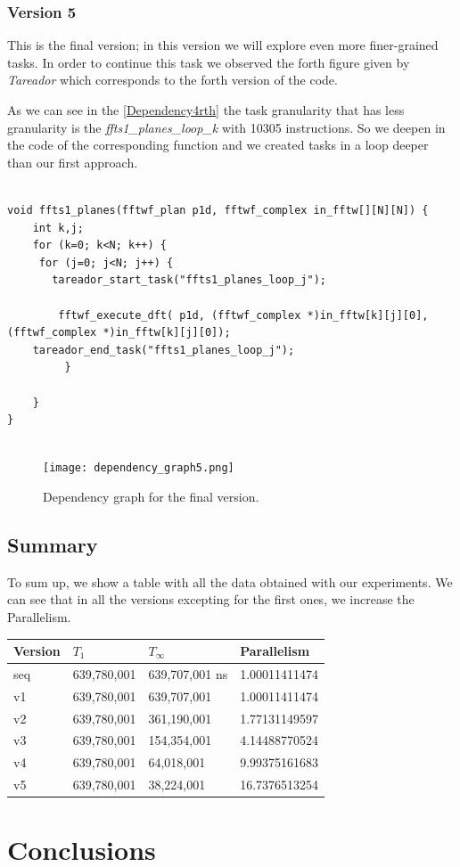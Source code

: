 \documentclass[12]{article}
\begin{document}
\subsubsection{Version 5}
This is the final version; in this version we will explore even more finer-grained tasks. In order to continue this task we observed the forth figure given by \textit{Tareador} which corresponds to the forth version of the code. 

As we can see in the \ref{Dependency4rth} the task granularity that has less granularity is the \textit{ffts1_planes_loop_k} with 10305 instructions. So we deepen in the code of the corresponding function and we created tasks in a loop deeper than our first approach. 
\begin{lstlisting}

void ffts1_planes(fftwf_plan p1d, fftwf_complex in_fftw[][N][N]) {
    int k,j;
    for (k=0; k<N; k++) {
     for (j=0; j<N; j++) {
       tareador_start_task("ffts1_planes_loop_j");

        fftwf_execute_dft( p1d, (fftwf_complex *)in_fftw[k][j][0], (fftwf_complex *)in_fftw[k][j][0]);
    tareador_end_task("ffts1_planes_loop_j");
         }

    }
}


\end{lstlisting}
\bigskip

\begin{figure}[H]
\centering  \texttt{[image: dependency\_graph5.png]}
  \caption{Dependency graph for the final version.}
  \label{fig:Dependency5}
\end{figure}

\subsection{Summary}

To sum up, we show a table with all the data obtained with our experiments. We can see that in all the versions excepting for the first ones, we increase the Parallelism.
\\
\medskip
\begin{table}[h]
\centering
\begin{tabular}{|l|l|l|l|}
\hline
Version & $T_1 $ & $T_\infty$ & Parallelism \\ \hline
seq     & 639,780,001   & 639,707,001 ns   &        1.00011411474     \\ \hline
v1      &  639,780,001  & 639,707,001  &         1.00011411474      \\ \hline
v2      & 639,780,001   & 361,190,001   &      1.77131149597      \\ \hline
v3      & 639,780,001   & 154,354,001&         4.14488770524    \\ \hline
v4      & 639,780,001   &  64,018,001   &        9.99375161683     \\ \hline
v5      &639,780,001     & 38,224,001  &        16.7376513254    \\ \hline
\end{tabular}
\end{table}


\section{Conclusions}
\end{document}
